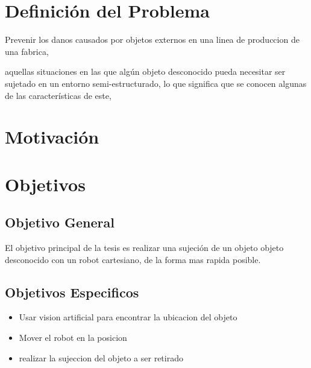  
\section{Definición del Problema}

Prevenir los danos causados por objetos externos en una linea de produccion de una fabrica, 

aquellas situaciones en las que algún objeto desconocido pueda necesitar ser  sujetado en un entorno semi-estructurado, lo que significa que se conocen algunas de las características de este,

\section{Motivación}



\section{Objetivos}

\subsection{Objetivo General}

El objetivo principal de la tesis es realizar una sujeción de un objeto objeto desconocido con un robot cartesiano, de la forma mas rapida posible.

\subsection{Objetivos Especificos}
\begin{itemize}
	 
\item Usar vision artificial para encontrar la ubicacion del objeto


\item Mover el robot en la posicion 


\item realizar la sujeccion del objeto a ser retirado


\end{itemize}


